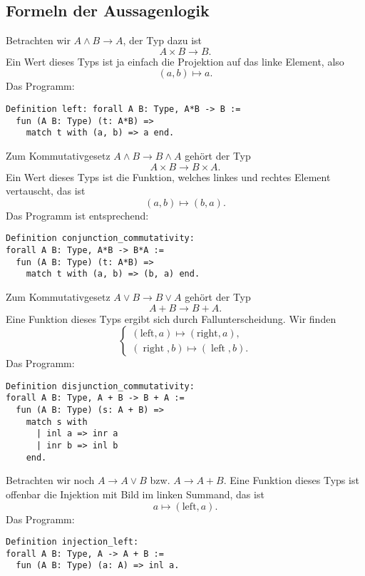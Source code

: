 \documentclass[a4paper,10pt,fleqn,twocolumn,twoside,dvipdfmx]{scrartcl}
\numberwithin{equation}{section}
\begin{document}
\subsection{Formeln der Aussagenlogik}

Betrachten wir $A\land B\to A$, der Typ dazu ist
\[A\times B\to B.\]
Ein Wert dieses Typs ist ja einfach die Projektion auf das linke
Element, also
\[(a, b)\mapsto a.\]
Das Programm:
\begin{lstlisting}[language=Coq]
Definition left: forall A B: Type, A*B -> B :=
  fun (A B: Type) (t: A*B) =>
    match t with (a, b) => a end.
\end{lstlisting}
Zum Kommutativgesetz $A\land B\to B\land A$ gehört der Typ
\begin{equation}
A\times B\to B\times A.
\end{equation}
Ein Wert dieses Typs ist die Funktion, welches linkes und rechtes
Element vertauscht, das ist
\[(a, b)\mapsto (b, a).\]
Das Programm ist entsprechend:
\begin{lstlisting}[language=Coq]
Definition conjunction_commutativity:
forall A B: Type, A*B -> B*A :=
  fun (A B: Type) (t: A*B) =>
    match t with (a, b) => (b, a) end.
\end{lstlisting}
Zum Kommutativgesetz $A\lor B\to B\lor A$ gehört der Typ
\begin{equation}
A+B\to B+A.
\end{equation}
Eine Funktion dieses Typs ergibt sich durch Fallunterscheidung.
Wir finden
\begin{equation}
\begin{cases}
  (\mathrm{left},a)  \mapsto (\mathrm{right},a),\\
  (\operatorname{right},b) \mapsto (\operatorname{left},b).\end{cases}
\end{equation}
Das Programm:
\begin{lstlisting}[language=Coq]
Definition disjunction_commutativity:
forall A B: Type, A + B -> B + A :=
  fun (A B: Type) (s: A + B) =>
    match s with
      | inl a => inr a
      | inr b => inl b
    end.
\end{lstlisting}
Betrachten wir noch $A\to A\lor B$ bzw. $A\to A+B$. Eine Funktion
dieses Typs ist offenbar die Injektion mit Bild im linken Summand,
das ist
\begin{equation}
a\mapsto (\mathrm{left},a).
\end{equation}
Das Programm:
\begin{lstlisting}[language=Coq]
Definition injection_left:
forall A B: Type, A -> A + B :=
  fun (A B: Type) (a: A) => inl a.
\end{lstlisting}
\end{document}
